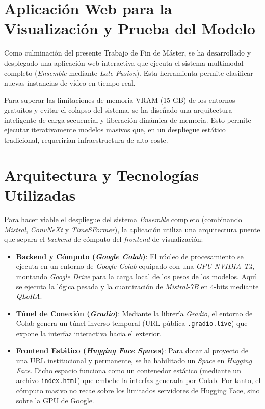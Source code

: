 \section{Aplicación Web para la Visualización y Prueba del Modelo}
\label{ap:AplicacionWeb}
Como culminación del presente Trabajo de Fin de Máster, se ha desarrollado y desplegado una aplicación web interactiva que ejecuta el sistema multimodal completo (\textit{Ensemble} mediante \textit{Late Fusion}). Esta herramienta permite clasificar nuevas instancias de vídeo en tiempo real. 

Para superar las limitaciones de memoria VRAM (15 GB) de los entornos gratuitos y evitar el colapso del sistema, se ha diseñado una arquitectura inteligente de carga secuencial y liberación dinámica de memoria. Esto permite ejecutar iterativamente modelos masivos que, en un despliegue estático tradicional, requerirían infraestructura de alto coste.  

\section*{Arquitectura y Tecnologías Utilizadas}
Para hacer viable el despliegue del sistema \textit{Ensemble} completo (combinando \textit{Mistral}, \textit{ConvNeXt} y \textit{TimeSFormer}), la aplicación utiliza una arquitectura puente que separa el \textit{backend} de cómputo del \textit{frontend} de visualización:
\begin{itemize}
    \item \textbf{Backend y Cómputo (\textit{Google Colab})}: El núcleo de procesamiento se ejecuta en un entorno de \textit{Google Colab} equipado con una \textit{GPU NVIDIA T4}, montando \textit{Google Drive} para la carga local de los pesos de los modelos. Aquí se ejecuta la lógica pesada y la cuantización de \textit{Mistral-7B} en 4-bits mediante \textit{QLoRA}.
    \item \textbf{Túnel de Conexión (\textit{Gradio})}: Mediante la librería \textit{Gradio}, el entorno de Colab genera un túnel inverso temporal (URL pública \texttt{.gradio.live}) que expone la interfaz interactiva hacia el exterior.
    \item \textbf{Frontend Estático (\textit{Hugging Face Spaces})}: Para dotar al proyecto de una URL institucional y permanente, se ha habilitado un \textit{Space} en \textit{Hugging Face}. Dicho espacio funciona como un contenedor estático (mediante un archivo \texttt{index.html}) que embebe la interfaz generada por Colab. Por tanto, el cómputo masivo no recae sobre los limitados servidores de Hugging Face, sino sobre la GPU de Google.
\end{itemize}

